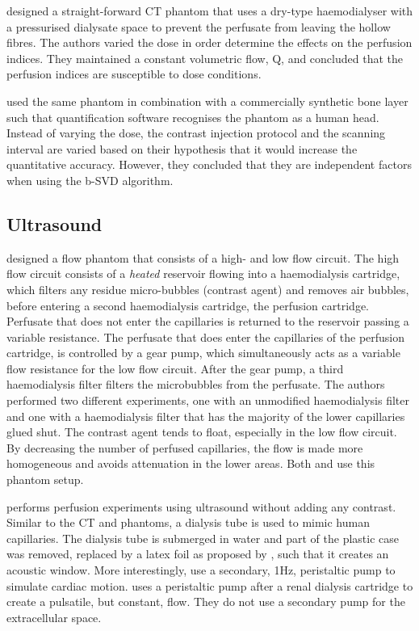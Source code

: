 \cite{suzuki2017quantitative} designed a straight-forward \ac{CT} phantom that uses a dry-type haemodialyser with a pressurised dialysate space to prevent the perfusate from leaving the hollow fibres. The authors varied the dose in order determine the effects on the perfusion indices. They maintained a constant volumetric flow, Q, and concluded that the perfusion indices are susceptible to dose conditions. 

\cite{hashimoto2018effect} used the same phantom in combination with a commercially synthetic bone layer such that quantification software recognises the phantom as a human head. Instead of varying the dose, the contrast injection protocol and the scanning interval are varied based on their hypothesis that it would increase the quantitative accuracy. However, they concluded that they are independent factors when using the b-SVD algorithm. 

\subsection{Ultrasound}

\cite{veltmann2002design} designed a flow phantom that consists of a high- and low flow circuit. The high flow circuit consists of a \textit{heated} reservoir flowing into a haemodialysis cartridge, which filters any residue micro-bubbles (contrast agent) and removes air bubbles, before entering a second haemodialysis cartridge, the perfusion cartridge. Perfusate that does not enter the capillaries is returned to the reservoir passing a variable resistance. The perfusate that does enter the capillaries of the perfusion cartridge, is controlled by a gear pump, which simultaneously acts as a variable flow resistance for the low flow circuit. After the gear pump, a third haemodialysis filter filters the microbubbles from the perfusate. The authors performed two different experiments, one with an unmodified haemodialysis filter and one with a haemodialysis filter that has the majority of the lower capillaries glued shut. The contrast agent tends to float, especially in the low flow circuit. By decreasing the number of perfused capillaries, the flow is made more homogeneous and avoids attenuation in the lower areas. Both \cite{sakano2015power} and \cite{lohmaier2004vitro} use this phantom setup.

\cite{kim2016efficiency} performs perfusion experiments using ultrasound without adding any contrast. Similar to the \ac{CT} and  phantoms, a dialysis tube is used to mimic human capillaries. The dialysis tube is submerged in water and part of the plastic case was removed, replaced by a latex foil as proposed by \cite{veltmann2002design}, such that it creates an acoustic window. More interestingly, \cite{kim2016efficiency} use a secondary, 1Hz, peristaltic pump to simulate cardiac motion. \cite{gauthier2011perfusion} uses a peristaltic pump after a renal dialysis cartridge to create a pulsatile, but constant, flow. They do not use a secondary pump for the extracellular space.

